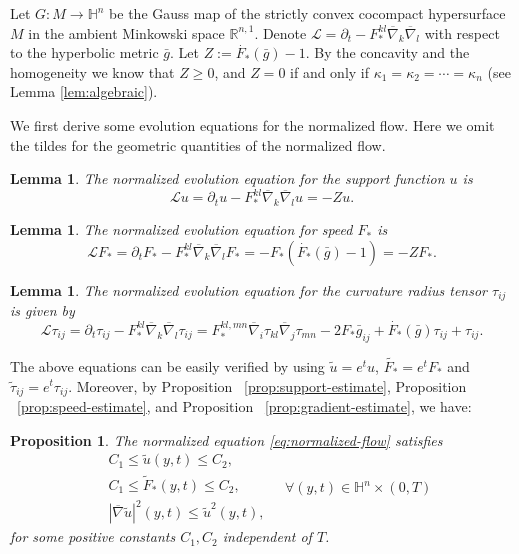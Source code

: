 \documentclass[10pt,a4paper]{amsart}
\newtheorem{lemma}[theorem]{Lemma}
\newtheorem{proposition}[theorem]{Proposition}
\newcommand{\abs}[1]{\left\lvert{#1}\right\rvert}
\newcommand{\R}{\ensuremath{\mathbb{R}}}
\renewcommand{\H}{{\mathbb{H}}}
\newcommand{\bnabla}{\overline{\nabla}}
\newcommand{\bg}{\bar{g}}
\numberwithin{equation}{section}
\begin{document}
Let \(G:M\to \H^n\) be the Gauss map of the strictly convex cocompact hypersurface \(M\) in the ambient Minkowski space \(\R^{n,1}\). Denote \(\mathscr{L} = \partial_t - F_*^{kl}\bnabla_k \bnabla_l\) with respect to the hyperbolic metric \(\bg\). 
Let \(Z := \dot{F_*}(\bg)-1 \). By the concavity and the homogeneity we know that \(Z \geq 0\), and \(Z=0\) if and only if \(\kappa_1=\kappa_2 =\cdots=\kappa_n\) (see Lemma \ref{lem:algebraic}).

We first derive some evolution equations for the normalized flow. Here we omit the tildes for the geometric quantities of the normalized flow. 
\begin{lemma}\label{lem:normalized-equation-for-u}
The normalized evolution equation for the support function \(u\) is
\[ \mathscr{L}u = \partial_t u - F_*^{kl}\bnabla_k\bnabla_l u = - Zu.\]
\end{lemma}

\begin{lemma}
    The normalized evolution equation for speed $F_*$ is 
    \[\mathscr{L}F_* =  \partial_t F_* - F_*^{kl}\bnabla_k\bnabla_l F_* = - F_* \left(\dot{F_*}(\bg) - 1\right) = - ZF_*.  \]
\end{lemma}
\begin{lemma}
    The normalized evolution equation for the curvature radius tensor \(\tau_{ij}\) is given by 
    \[ \mathscr{L}\tau_{ij} = \partial_t \tau_{ij} - F_*^{kl}\bnabla_k\bnabla_l \tau_{ij} = F_*^{kl,mn}\bnabla_i\tau_{kl}\bnabla_j \tau_{mn} - 2F_* \bg_{ij} + \dot{F_*}(\bg)\tau_{ij} + \tau_{ij}.  \] 
\end{lemma}
The above equations can be easily verified by using \(\tilde{u} = e^t u\), \(\tilde{F_*} = e^t F_*\) and \(\tilde{\tau}_{ij} = e^t \tau_{ij}\). Moreover, by Proposition ~\ref{prop:support-estimate}, Proposition ~\ref{prop:speed-estimate}, and Proposition ~\ref{prop:gradient-estimate}, we have:
\begin{proposition}\label{prop:normalized-estimates}
    The normalized equation \eqref{eq:normalized-flow} satisfies 
    \begin{equation}
        \begin{aligned}
            &C_1 \leq \tilde{u}(y,t) \leq C_2, \\
            &C_1\leq \tilde{F}_*(y,t) \leq C_2, \\
            &\abs{\bnabla \tilde{u}}^2(y,t) \leq \tilde{u}^2(y,t),
        \end{aligned}\quad \forall (y,t)\in \H^n\times (0,T)
    \end{equation}
    for some positive constants \(C_1,C_2\) independent of \(T\).
\end{proposition}
\end{document}
